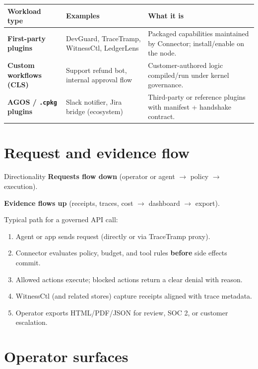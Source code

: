 \begin{center}
\renewcommand{\arraystretch}{1.3}
\begin{tabularx}{0.95\textwidth}{@{}>{\bfseries}p{} p{} X@{}}
\toprule
\textbf{Workload type} & \textbf{Examples} & \textbf{What it is} \\
\midrule
First-party plugins & DevGuard, TraceTramp, WitnessCtl, LedgerLens & Packaged capabilities maintained by Connector; install/enable on the node. \\
\midrule
Custom workflows (CLS) & Support refund bot, internal approval flow & Customer-authored logic compiled/run under kernel governance. \\
\midrule
AGOS / \texttt{.cpkg} plugins & Slack notifier, Jira bridge (ecosystem) & Third-party or reference plugins with manifest + handshake contract. \\
\bottomrule
\end{tabularx}
\end{center}

\section{Request and evidence flow}

\begin{insightbox}{Directionality}
\textbf{Requests flow down} (operator or agent $\rightarrow$ policy $\rightarrow$ execution).

\textbf{Evidence flows up} (receipts, traces, cost $\rightarrow$ dashboard $\rightarrow$ export).
\end{insightbox}

Typical path for a governed API call:

\begin{enumerate}
  \item Agent or app sends request (directly or via TraceTramp proxy).
  \item Connector evaluates policy, budget, and tool rules \textbf{before} side effects commit.
  \item Allowed actions execute; blocked actions return a clear denial with reason.
  \item WitnessCtl (and related stores) capture receipts aligned with trace metadata.
  \item Operator exports HTML/PDF/JSON for review, SOC 2, or customer escalation.
\end{enumerate}

\section{Operator surfaces}

